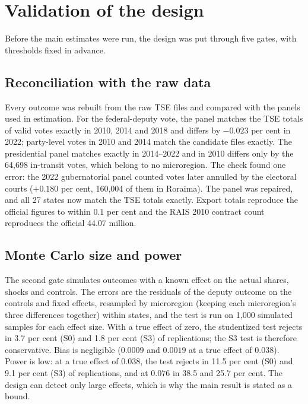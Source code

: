 \documentclass[
	11pt,				%
	oneside,			%
	a4paper,			%
	english,			%
	english				%
	]{abntex2ppgsi}
\theoremstyle{plain}
\theoremstyle{remark}
\theoremstyle{plain}%
\theoremstyle{remark}%
\begin{document}
\section{Validation of the design}
\label{sec:robustness}

Before the main estimates were run, the design was put through five gates, with thresholds fixed in advance.

\subsection{Reconciliation with the raw data}

Every outcome was rebuilt from the raw TSE files and compared with the panels used in estimation. For the federal-deputy vote, the panel matches the TSE totals of valid votes exactly in 2010, 2014 and 2018 and differs by $-0.023$ per cent in 2022; party-level votes in 2010 and 2014 match the candidate files exactly. The presidential panel matches exactly in 2014--2022 and in 2010 differs only by the 64,698 in-transit votes, which belong to no microregion. The check found one error: the 2022 gubernatorial panel counted votes later annulled by the electoral courts ($+0.180$ per cent, 160,004 of them in Roraima). The panel was repaired, and all 27 states now match the TSE totals exactly. Export totals reproduce the official figures to within $0.1$ per cent and the RAIS 2010 contract count reproduces the official 44.07 million.

\subsection{Monte Carlo size and power}
\label{subsec:montecarlo}

The second gate simulates outcomes with a known effect on the actual shares, shocks and controls. The errors are the residuals of the deputy outcome on the controls and fixed effects, resampled by microregion (keeping each microregion's three differences together) within states, and the test is run on 1,000 simulated samples for each effect size. With a true effect of zero, the studentized test rejects in 3.7 per cent (S0) and 1.8 per cent (S3) of replications; the S3 test is therefore conservative. Bias is negligible ($0.0009$ and $0.0019$ at a true effect of $0.038$). Power is low: at a true effect of $0.038$, the test rejects in 11.5 per cent (S0) and 9.1 per cent (S3) of replications, and at $0.076$ in 38.5 and 25.7 per cent. The design can detect only large effects, which is why the main result is stated as a bound.
\end{document}
